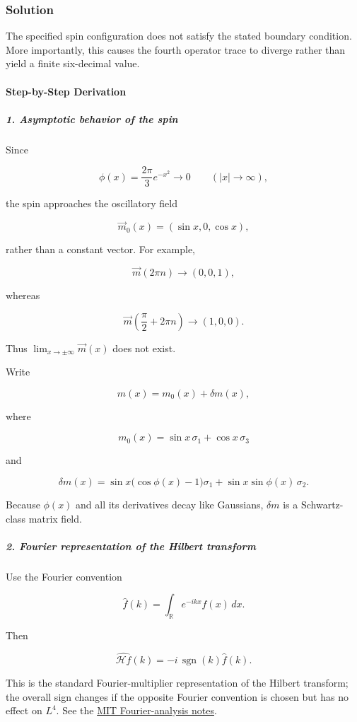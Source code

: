 \subsubsection*{Solution}
The specified spin configuration does not satisfy the stated boundary condition. More importantly, this causes the fourth operator trace to diverge rather than yield a finite six-decimal value.

\paragraph*{Step-by-Step Derivation}

\subparagraph*{1. Asymptotic behavior of the spin}

Since

\[
\phi(x)=\frac{2\pi}{3}e^{-x^2}\longrightarrow 0 \qquad (|x|\to\infty),
\]

the spin approaches the oscillatory field

\[
\vec m_0(x)=(\sin x,0,\cos x),
\]

rather than a constant vector. For example,

\[
\vec m(2\pi n)\longrightarrow(0,0,1),
\]

whereas

\[
\vec m\left(\frac{\pi}{2}+2\pi n\right) \longrightarrow(1,0,0).
\]

Thus $\lim_{x\to\pm\infty}\vec m(x)$ does not exist.

Write

\[
m(x)=m_0(x)+\delta m(x),
\]

where

\[
m_0(x)=\sin x\,\sigma_1+\cos x\,\sigma_3
\]

and

\[
\delta m(x) = \sin x\bigl(\cos\phi(x)-1\bigr)\sigma_1 +\sin x\sin\phi(x)\,\sigma_2.
\]

Because $\phi(x)$ and all its derivatives decay like Gaussians, $\delta m$ is a Schwartz-class matrix field.

\subparagraph*{2. Fourier representation of the Hilbert transform}

Use the Fourier convention

\[
\widehat f(k)=\int_{\mathbb R}e^{-ikx}f(x)\,dx.
\]

Then

\[
\widehat{\mathcal H f}(k) =-i\,\operatorname{sgn}(k)\widehat f(k).
\]

This is the standard Fourier-multiplier representation of the Hilbert transform; the overall sign changes if the opposite Fourier convention is chosen but has no effect on $L^4$. See the \href{\detokenize{https://ocw.mit.edu/courses/res-18-015-topics-in-fourier-analysis-spring-2024/mitres_18_015_s24_lec21.pdf}}{MIT Fourier-analysis notes}.


